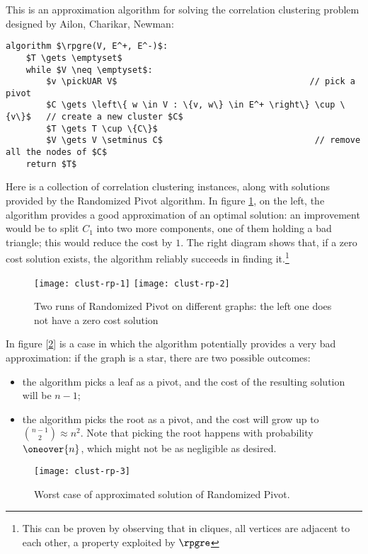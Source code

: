 This is an approximation algorithm for solving the correlation clustering problem designed by Ailon, Charikar, Newman:
\begin{lstlisting}[caption = {Randomized Pivot algorithm}, label = {lst:clust-random-pivot}]
algorithm $\rpgre(V, E^+, E^-)$:
    $T \gets \emptyset$
    while $V \neq \emptyset$:
        $v \pickUAR V$                                      // pick a pivot 
        $C \gets \left\{ w \in V : \{v, w\} \in E^+ \right\} \cup \{v\}$   // create a new cluster $C$
        $T \gets T \cup \{C\}$
        $V \gets V \setminus C$                              // remove all the nodes of $C$
    return $T$
\end{lstlisting}

\begin{example}
    Here is a collection of correlation clustering instances, along with solutions provided by the Randomized Pivot algorithm. In figure \ref{fig:clust-rp-1}, on the left, the algorithm provides a good approximation of an optimal solution: an improvement would be to split $C_1$ into two more components, one of them holding a bad triangle; this would reduce the cost by $1$. The right diagram shows that, if a zero cost solution exists, the algorithm reliably succeeds in finding it.\footnote{This can be proven by observing that in cliques, all vertices are adjacent to each other, a property exploited by $\rpgre$}
    
    \begin{figure}[ht]
        \centering
        \texttt{[image: clust-rp-1]}
        \hspace{1pt}
        \texttt{[image: clust-rp-2]}
        \caption{Two runs of Randomized Pivot on different graphs: the left one does not have a zero cost solution}
        \label{fig:clust-rp-1}
    \end{figure}

    In figure [\ref{fig:clust-rp-3}] is a case in which the algorithm potentially provides a very bad approximation: if the graph is a star, there are two possible outcomes:
    \begin{itemize}
        \item the algorithm picks a leaf as a pivot, and the cost of the resulting solution will be $n - 1$;
        \item the algorithm picks the root as a pivot, and the cost will grow up to $\binom{n-1}{2} \approx n^2$. Note that picking the root \uar{} happens with probability $\oneover{n}$, which might not be as negligible as desired.
    \end{itemize}
    
    \begin{figure}
        \centering
        \texttt{[image: clust-rp-3]}
        \caption{Worst case of approximated solution of Randomized Pivot.}
        \label{fig:clust-rp-3}
    \end{figure}    
\end{example}

